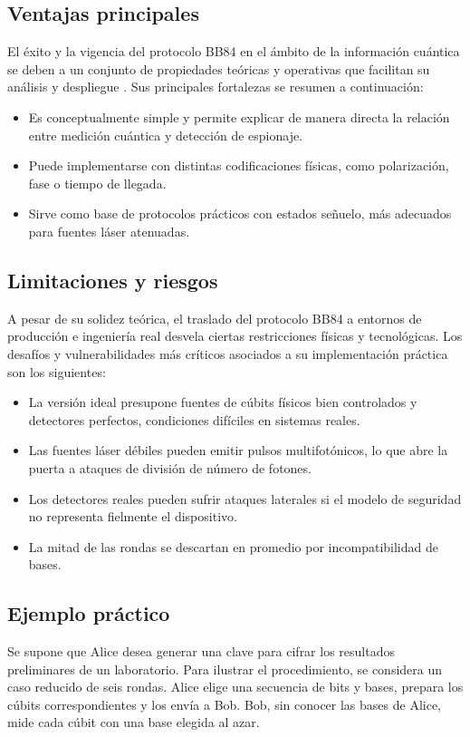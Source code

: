 \subsection{Ventajas principales}
El éxito y la vigencia del protocolo BB84 en el ámbito de la información cuántica se deben a un conjunto de propiedades teóricas y operativas que facilitan su análisis y despliegue \cite{bennett1984}. Sus principales fortalezas se resumen a continuación:
\begin{itemize}
    \item Es conceptualmente simple y permite explicar de manera directa la relación entre medición cuántica y detección de espionaje.
    \item Puede implementarse con distintas codificaciones físicas, como polarización, fase o tiempo de llegada.
    \item Sirve como base de protocolos prácticos con estados señuelo, más adecuados para fuentes láser atenuadas.
\end{itemize}

\subsection{Limitaciones y riesgos}
A pesar de su solidez teórica, el traslado del protocolo BB84 a entornos de producción e ingeniería real desvela ciertas restricciones físicas y tecnológicas. Los desafíos y vulnerabilidades más críticos asociados a su implementación práctica son los siguientes:
\begin{itemize}
    \item La versión ideal presupone fuentes de cúbits físicos bien controlados y detectores perfectos, condiciones difíciles en sistemas reales.
    \item Las fuentes láser débiles pueden emitir pulsos multifotónicos, lo que abre la puerta a ataques de división de número de fotones.
    \item Los detectores reales pueden sufrir ataques laterales si el modelo de seguridad no representa fielmente el dispositivo.
    \item La mitad de las rondas se descartan en promedio por incompatibilidad de bases.
\end{itemize}

\subsection{Ejemplo práctico}
Se supone que Alice desea generar una clave para cifrar los resultados preliminares de un laboratorio. Para ilustrar el procedimiento, se considera un caso reducido de seis rondas. Alice elige una secuencia de bits y bases, prepara los cúbits correspondientes y los envía a Bob. Bob, sin conocer las bases de Alice, mide cada cúbit con una base elegida al azar.

